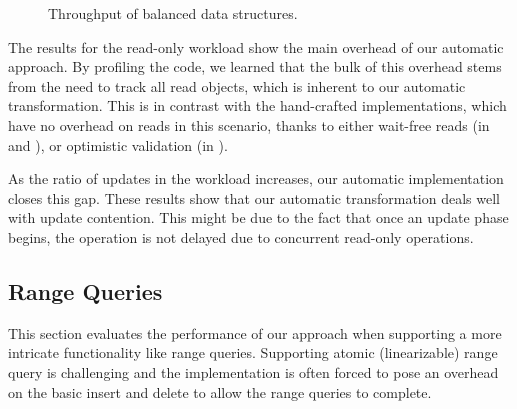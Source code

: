 \begin{figure*}
\begin{center}

\end{center}
\caption{Throughput of balanced data
structures.}
\label{evaluation:results:balanced}
\end{figure*}

The results for the read-only workload show the main overhead
of our automatic approach. By profiling the code, we learned 
that the bulk of this overhead stems from the need to track all read objects,
which is inherent to our automatic transformation. 
This is in contrast with the hand-crafted implementations,
which have no overhead on reads in this scenario, thanks to either 
wait-free reads (in \danaTree and \danaAVL), or optimistic validation (in \bronson). 
 
As the ratio of updates in the workload increases, our automatic implementation 
closes this gap.
These results show that our automatic transformation deals well with update contention. 
This might be due to the fact that once
an update phase begins, the operation is not delayed due to concurrent 
read-only operations. 


\subsection{Range Queries}
\label{sec:range} 

This section evaluates the performance of our approach when supporting a more
intricate functionality like range queries. Supporting atomic (linearizable)
range query is challenging and the implementation is often forced to pose an
overhead on the basic insert and delete to allow the range queries to complete.
 
